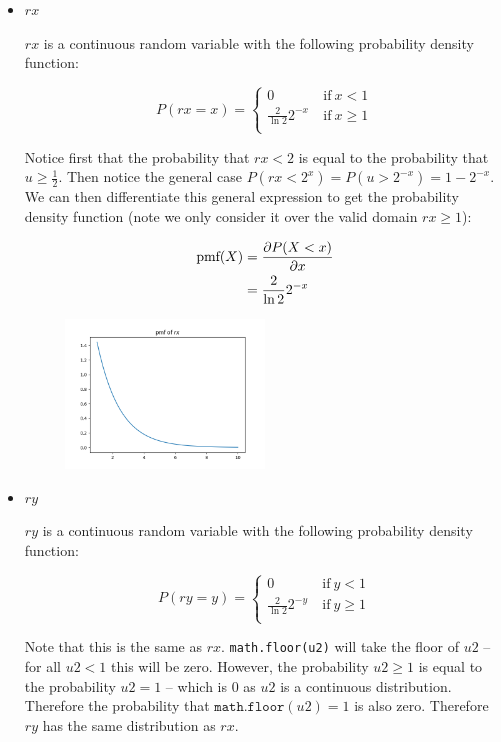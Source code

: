 \documentclass[10pt,\jkfside,a4paper]{article}
\begin{document}
\begin{enumerate}[label=\arabic*]
\begin{itemize}

\item $rx$

$rx$ is a continuous random variable with the following probability density
function:

\[
P(rx = x) =
\begin{cases}
0 & \ \text{if} \ x < 1 \\
\frac{2}{\ln 2} 2^{-x} & \ \text{if} \ x \geq 1 \\
\end{cases}
\]

Notice first that the probability that $rx < 2$ is equal to the probability
that $u \geq \frac{1}{2}$. Then notice the general case $P\left(rx <
2^x\right) = P\left(u > 2^{-x}\right) = 1 - 2^{-x}$. We can then
differentiate this general expression to get the probability density
function (note we only consider it over the valid domain $rx \geq 1$):

\[
\begin{split}
\text{pmf}(X) &= \pdv{P(X < x)}{x} \\
&= \frac{2}{\ln 2} 2^{-x} \\
\end{split}
\]

\begin{figure}[H]
\centering
\includegraphics[width=0.5\textwidth]{./q16_rx_img}
\end{figure}

\item $ry$

$ry$ is a continuous random variable with the following probability density
function:

\[
P(ry = y) =
\begin{cases}
0 & \ \text{if} \ y < 1 \\
\frac{2}{\ln 2} 2^{-y} & \ \text{if} \ y \geq 1 \\
\end{cases}
\]

Note that this is the same as $rx$. \texttt{math.floor(u2)} will take the
floor of $u2$ -- for all $u2 < 1$ this will be zero. However, the probability
$u2 \geq 1$ is equal to the probability $u2 = 1$ -- which  is 0 as $u2$ is a
continuous distribution. Therefore the probability that $\texttt{math.floor}
(u2) = 1$ is also zero. Therefore $ry$ has the same distribution as $rx$.


\end{itemize}
\end{enumerate}
\end{document}
